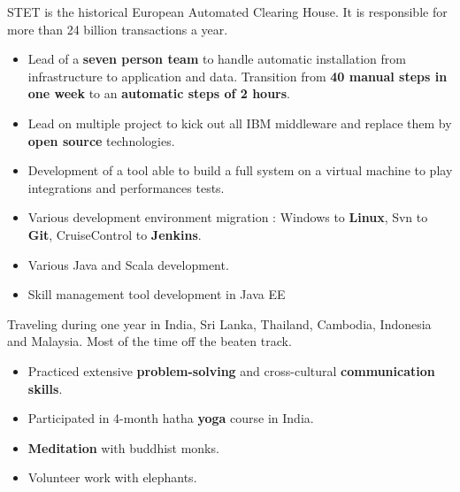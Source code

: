 \documentclass[10pt,a4paper,ragged2e]{altacv}
\begin{document}
	
		STET is the historical European Automated Clearing House. It is responsible for more than 24 billion transactions a year.
	
		\medskip
		\begin{itemize}
			\item Lead of a \textbf{seven person team} to handle automatic installation from infrastructure to application and data. Transition from \textbf{40 manual steps in one week} to an \textbf{automatic steps of 2 hours}.
			\item Lead on multiple project to kick out all IBM middleware and replace them by\textbf{ open source} technologies.
			\item Development of a tool able to build a full system on a virtual machine to play integrations and performances tests.
			
		\end{itemize}
	\divider

		\begin{itemize}
			\item Various development environment migration : Windows to \textbf{Linux}, Svn to \textbf{Git}, CruiseControl to \textbf{Jenkins}.
			\item Various Java and Scala development.
		\end{itemize}
	\divider

		\begin{itemize}
			\item Skill management tool development in Java EE
		\end{itemize}

\bigskip
{}
	
		Traveling during one year in India, Sri Lanka, Thailand, Cambodia, Indonesia and Malaysia. Most of the time off the beaten track. 
		
		\medskip
		\begin{itemize}
			\item Practiced extensive \textbf{problem-solving} and cross-cultural \textbf{communication skills}.
			\item Participated in 4-month hatha \textbf{yoga} course in India.
			\item \textbf{Meditation} with buddhist monks.
			\item Volunteer work with elephants.
		\end{itemize}
\end{document}
